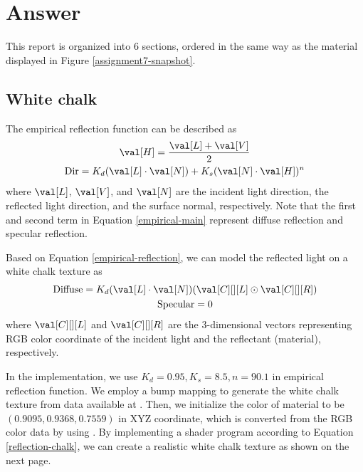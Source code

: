 \section{Answer}

This report is organized into 6 sections, ordered in the same way as the material displayed in Figure \ref{assignment7-snapshot}.

\subsection{White chalk}

The empirical reflection function can be described as
\begin{subequations} \label{empirical-reflection}
    \begin{gather}
        \val[H] = \frac{\val[L] + \val[V]}{2} \\
        \text{Dir} = K_d(\val[L] \cdot \val[N]) + K_s (\val[N] \cdot \val[H])^n \label{empirical-main}
    \end{gather}
\end{subequations}
where $\val[L]$, $\val[V]$, and $\val[N]$ are the incident light direction, the reflected light direction, and the surface normal, respectively. Note that the first and second term in Equation \eqref{empirical-main} represent diffuse reflection and specular reflection. 

Based on Equation \eqref{empirical-reflection}, we can model the reflected light on a white chalk texture as
\begin{subequations}\label{reflection-chalk}
    \begin{gather}
        \text{Diffuse} = K_d(\val[L] \cdot \val[N])(\val[C][][L] \odot \val[C][][R]) \\
        \text{Specular} = 0
    \end{gather}
\end{subequations}
where $\val[C][][L]$ and $\val[C][][R]$ are the 3-dimensional vectors representing RGB color coordinate of the incident light and the reflectant (material), respectively.

In the implementation, we use $K_d = 0.95, K_s = 8.5, n = 90.1$ in empirical reflection function. We employ a bump mapping to generate the white chalk texture from data available at \cite{texture-chalk}. Then, we initialize the color of material to be $(0.9095,0.9368,0.7559)$ in XYZ coordinate, which is converted from the RGB color data \cite{color-chalk} by using \cite{color-converter}. By implementing a shader program according to Equation \eqref{reflection-chalk}, we can create a realistic white chalk texture as shown on the next page.

